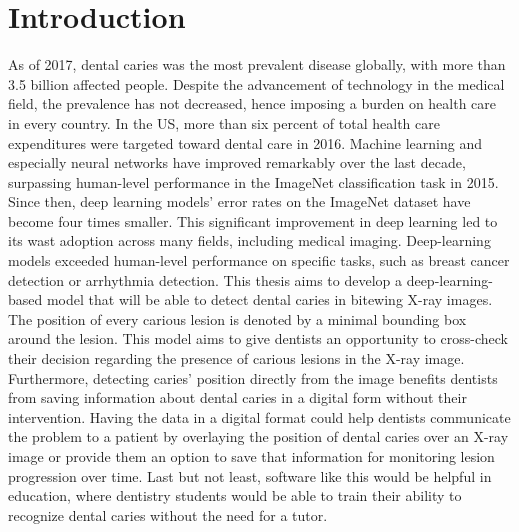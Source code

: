 \chapter{Introduction}

As of 2017, dental caries was the most prevalent disease globally\cite{Kassebaum2015}\cite{James2018}, with more than 3.5 billion affected people. Despite the advancement of technology in the medical field, the prevalence has not decreased, hence imposing a burden on health care in every country. In the US, more than six percent of total health care expenditures were targeted toward dental care in 2016\cite{Hung2020}.
\newline
Machine learning and especially neural networks have improved remarkably over the last decade, surpassing human-level performance in the ImageNet classification task in 2015\cite{He2015ICCV}. Since then, deep learning models' error rates on the ImageNet dataset have become four times smaller\cite{paperwithcode}. This significant improvement in deep learning led to its wast adoption across many fields, including medical imaging. Deep-learning models exceeded human-level performance on specific tasks, such as breast cancer detection\cite{RodriguezRuiz2019} or arrhythmia detection\cite{Hannun2019}.
\newline
This thesis aims to develop a deep-learning-based model that will be able to detect dental caries in bitewing X-ray images. The position of every carious lesion is denoted by a minimal bounding box around the lesion. This model aims to give dentists an opportunity to cross-check their decision regarding the presence of carious lesions in the X-ray image. Furthermore, detecting caries' position directly from the image benefits dentists from saving information about dental caries in a digital form without their intervention. Having the data in a digital format could help dentists communicate the problem to a patient by overlaying the position of dental caries over an X-ray image or provide them an option to save that information for monitoring lesion progression over time. Last but not least, software like this would be helpful in education, where dentistry students would be able to train their ability to recognize dental caries without the need for a tutor.
\medskip



